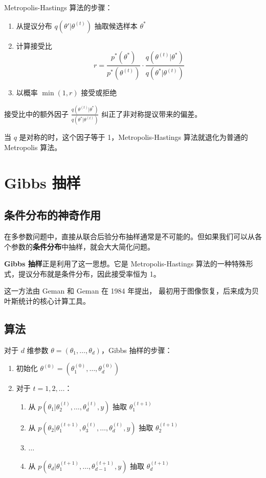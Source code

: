 Metropolis-Hastings 算法的步骤：
\begin{enumerate}
  \item 从提议分布 $q(\theta' | \theta^{(t)})$ 抽取候选样本 $\theta^*$
  \item 计算接受比
    \begin{equation}\label{eq:mh-acceptance-ratio}
    r = \frac{p^*(\theta^*)}{p^*(\theta^{(t)})} \cdot \frac{q(\theta^{(t)} | \theta^*)}{q(\theta^* | \theta^{(t)})}
    \end{equation}
  \item 以概率 $\min(1, r)$ 接受或拒绝
\end{enumerate}

接受比中的额外因子 $\frac{q(\theta^{(t)} | \theta^*)}{q(\theta^* | \theta^{(t)})}$ 纠正了非对称提议带来的偏差。

当 $q$ 是对称的时，这个因子等于 1，Metropolis-Hastings 算法就退化为普通的 Metropolis 算法。

\section{Gibbs 抽样}

\subsection{条件分布的神奇作用}

在多参数问题中，直接从联合后验分布抽样通常是不可能的。但如果我们可以从各个参数的\textbf{条件分布}中抽样，就会大大简化问题。

\textbf{Gibbs 抽样}正是利用了这一思想。它是 Metropolis-Hastings 算法的一种特殊形式，提议分布就是条件分布，因此接受率恒为 1。

这一方法由 Geman 和 Geman 在 1984 年提出，\cite{geman1984stochastic} 最初用于图像恢复，后来成为贝叶斯统计的核心计算工具。

\subsection{算法}

对于 $d$ 维参数 $\theta = (\theta_1, \ldots, \theta_d)$，Gibbs 抽样的步骤：

\begin{enumerate}
  \item 初始化 $\theta^{(0)} = (\theta_1^{(0)}, \ldots, \theta_d^{(0)})$
  \item 对于 $t = 1, 2, \ldots$：
    \begin{enumerate}
      \item 从 $p(\theta_1 | \theta_2^{(t)}, \ldots, \theta_d^{(t)}, y)$ 抽取 $\theta_1^{(t+1)}$
      \item 从 $p(\theta_2 | \theta_1^{(t+1)}, \theta_3^{(t)}, \ldots, \theta_d^{(t)}, y)$ 抽取 $\theta_2^{(t+1)}$
      \item $\ldots$
      \item 从 $p(\theta_d | \theta_1^{(t+1)}, \ldots, \theta_{d-1}^{(t+1)}, y)$ 抽取 $\theta_d^{(t+1)}$
    \end{enumerate}
\end{enumerate}

